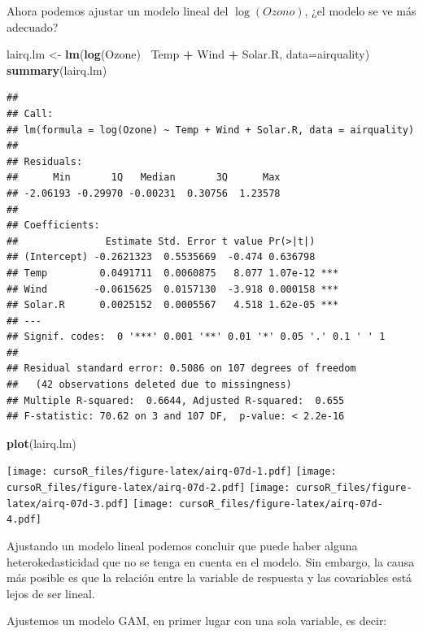 \documentclass[]{book}
\newenvironment{Shaded}{\begin{snugshade}}{\end{snugshade}}
\newcommand{\KeywordTok}[1]{\textcolor[rgb]{0.13,0.29,0.53}{\textbf{#1}}}
\newcommand{\DataTypeTok}[1]{\textcolor[rgb]{0.13,0.29,0.53}{#1}}
\newcommand{\StringTok}[1]{\textcolor[rgb]{0.31,0.60,0.02}{#1}}
\newcommand{\OperatorTok}[1]{\textcolor[rgb]{0.81,0.36,0.00}{\textbf{#1}}}
\newcommand{\NormalTok}[1]{#1}
\begin{document}
Ahora podemos ajustar un modelo lineal del \(\log(Ozono)\), ¿el modelo
se ve más adecuado?

\begin{Shaded}
\begin{Highlighting}[]
\NormalTok{lairq.lm <-}\StringTok{ }\KeywordTok{lm}\NormalTok{(}\KeywordTok{log}\NormalTok{(Ozone)}\OperatorTok{~}\StringTok{ }\NormalTok{Temp }\OperatorTok{+}\StringTok{ }\NormalTok{Wind }\OperatorTok{+}\StringTok{ }\NormalTok{Solar.R, }\DataTypeTok{data=}\NormalTok{airquality)}
\KeywordTok{summary}\NormalTok{(lairq.lm)}
\end{Highlighting}
\end{Shaded}

\begin{verbatim}
## 
## Call:
## lm(formula = log(Ozone) ~ Temp + Wind + Solar.R, data = airquality)
## 
## Residuals:
##      Min       1Q   Median       3Q      Max 
## -2.06193 -0.29970 -0.00231  0.30756  1.23578 
## 
## Coefficients:
##               Estimate Std. Error t value Pr(>|t|)    
## (Intercept) -0.2621323  0.5535669  -0.474 0.636798    
## Temp         0.0491711  0.0060875   8.077 1.07e-12 ***
## Wind        -0.0615625  0.0157130  -3.918 0.000158 ***
## Solar.R      0.0025152  0.0005567   4.518 1.62e-05 ***
## ---
## Signif. codes:  0 '***' 0.001 '**' 0.01 '*' 0.05 '.' 0.1 ' ' 1
## 
## Residual standard error: 0.5086 on 107 degrees of freedom
##   (42 observations deleted due to missingness)
## Multiple R-squared:  0.6644, Adjusted R-squared:  0.655 
## F-statistic: 70.62 on 3 and 107 DF,  p-value: < 2.2e-16
\end{verbatim}

\begin{Shaded}
\begin{Highlighting}[]
\KeywordTok{plot}\NormalTok{(lairq.lm)}
\end{Highlighting}
\end{Shaded}

\texttt{[image: cursoR\_files/figure-latex/airq-07d-1.pdf]}
\texttt{[image: cursoR\_files/figure-latex/airq-07d-2.pdf]}
\texttt{[image: cursoR\_files/figure-latex/airq-07d-3.pdf]}
\texttt{[image: cursoR\_files/figure-latex/airq-07d-4.pdf]}

Ajustando un modelo lineal podemos concluir que puede haber alguna
heterokedasticidad que no se tenga en cuenta en el modelo. Sin embargo,
la causa más posible es que la relación entre la variable de respuesta y
las covariables está lejos de ser lineal.

Ajustemos un modelo GAM, en primer lugar con una sola variable, es
decir:
\end{document}

